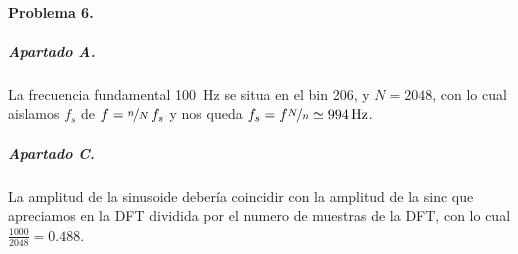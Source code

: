 \finishpage


\startpage
\paragraph{Problema 6.}

\subparagraph{Apartado A.}

La frecuencia fundamental \SI{100}{\hertz} se situa en el bin \num{206}, y
$N = 2048$, con lo cual aislamos $f_s$ de $f = \nicefrac{n}{N} \, f_s$ y nos
queda $f_s = f \nicefrac{N}{n} \simeq \SI{994}{\hertz}$.


\subparagraph{Apartado C.}

La amplitud de la sinusoide debería coincidir con la amplitud de la sinc que
apreciamos en la DFT dividida por el numero de muestras de la DFT, con lo
cual $\frac{1000}{2048} = \num{0.488}$.

\finishpage

